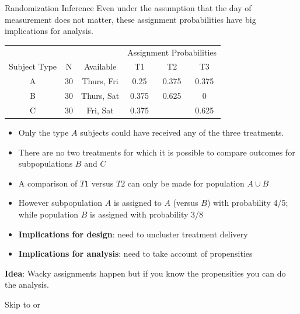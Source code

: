 \documentclass[
  11pt,
  ignorenonframetext,
]{beamer}
\begin{document}
\begin{frame}{Randomization Inference}
\protect\hypertarget{randomization-inference-7}{}
\footnotesize Even under the assumption that the day of measurement does
not matter, these assignment probabilities have big implications for
analysis.

\begin{table}\footnotesize
    \begin{tabular}{ccc|ccc}
          &       &       & \multicolumn{3}{|c}{Assignment Probabilities} \\
    Subject Type & N     & Available & T1    & T2    & T3 \\ \hline
    A     & 30    & Thurs, Fri & 0.25  & 0.375 & 0.375 \\
    B     & 30    & Thurs, Sat & 0.375 & 0.625 & 0 \\
    C     & 30    & Fri, Sat & 0.375 &       & 0.625 \\
    \end{tabular}
\end{table}

\begin{itemize} \footnotesize
\item Only the type $A$ subjects could have received any of the three treatments. 
\item There are no two treatments for which it is possible to compare outcomes for subpopulations $B$ and $C$
\item A comparison of $T1$ versus $T2$ can only be made for population $A \cup B$ 
\item However subpopulation $A$ is assigned to $A$ (versus $B$) with probability 4/5; while population $B$ is assigned with probability 3/8
\end{itemize}

\begin{itemize}
\item \textbf{Implications for design}: need to uncluster treatment delivery
\item \textbf{Implications for analysis}: need to take account of propensities
\end{itemize}

\color{red} \textbf{Idea}: Wacky assignments happen but if you know the
propensities you can do the analysis.

Skip to \hyperlink{subs}{} or
\hyperlink{ideas}{}
\end{frame}
\end{document}
